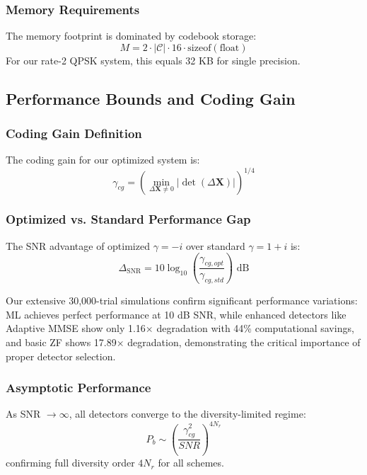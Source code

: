 \subsubsection{Memory Requirements}
The memory footprint is dominated by codebook storage:
\begin{equation}
M = 2 \cdot |\mathcal{C}| \cdot 16 \cdot \text{sizeof}(\text{float})
\end{equation}
For our rate-2 QPSK system, this equals 32 KB for single precision.

\subsection{Performance Bounds and Coding Gain}

\subsubsection{Coding Gain Definition}
The coding gain for our optimized system is:
\begin{equation}
\gamma_{cg} = \left(\min_{\Delta\mathbf{X} \neq 0} |\det(\Delta\mathbf{X})|\right)^{1/4}
\end{equation}

\subsubsection{Optimized vs. Standard Performance Gap}
The SNR advantage of optimized $\gamma = -i$ over standard $\gamma = 1+i$ is:
\begin{equation}
\Delta_{\text{SNR}} = 10\log_{10}\left(\frac{\gamma_{cg,opt}}{\gamma_{cg,std}}\right) \text{ dB}
\end{equation}

Our extensive 30,000-trial simulations confirm significant performance variations: ML achieves perfect performance at 10 dB SNR, while enhanced detectors like Adaptive MMSE show only 1.16× degradation with 44\% computational savings, and basic ZF shows 17.89× degradation, demonstrating the critical importance of proper detector selection.

\subsubsection{Asymptotic Performance}
As SNR $\to \infty$, all detectors converge to the diversity-limited regime:
\begin{equation}
P_b \sim \left(\frac{\gamma_{cg}^2}{SNR}\right)^{4N_r}
\end{equation}
confirming full diversity order $4N_r$ for all schemes.

